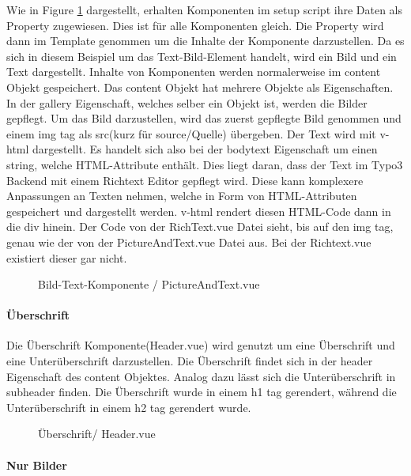 Wie in Figure \ref{fig:Bild-Text-Komponente} dargestellt, erhalten Komponenten im setup script ihre Daten als Property zugewiesen. Dies ist für alle Komponenten gleich. Die Property wird dann im Template genommen um die Inhalte der Komponente darzustellen. Da es sich in diesem Beispiel um das Text-Bild-Element handelt, wird ein Bild und ein Text dargestellt. Inhalte von Komponenten werden normalerweise im content Objekt gespeichert. Das content Objekt hat mehrere Objekte als Eigenschaften. In der gallery Eigenschaft, welches selber ein Objekt ist, werden die Bilder gepflegt. Um das Bild darzustellen, wird das zuerst gepflegte Bild genommen und einem img tag als src(kurz für source/Quelle) übergeben. Der Text wird mit v-html dargestellt. Es handelt sich also bei der bodytext Eigenschaft um einen string, welche HTML-Attribute enthält. Dies liegt daran, dass der Text im Typo3 Backend mit einem Richtext Editor gepflegt wird. Diese kann komplexere Anpassungen an Texten nehmen, welche in Form von HTML-Attributen gespeichert und dargestellt werden. v-html rendert diesen HTML-Code dann in die div hinein. Der Code von der RichText.vue Datei sieht, bis auf den img tag, genau wie der von der PictureAndText.vue Datei aus. Bei der Richtext.vue existiert dieser gar nicht.

\begin{figure}[htb]
\centering
{}
\caption{Bild-Text-Komponente / PictureAndText.vue}
\label{fig:Bild-Text-Komponente}
\end{figure}
\paragraph{Überschrift}
Die Überschrift Komponente(Header.vue) wird genutzt um eine Überschrift und eine Unterüberschrift darzustellen. Die Überschrift findet sich in der header Eigenschaft des content Objektes. Analog dazu lässt sich die Unterüberschrift in subheader finden. Die Überschrift wurde in einem h1 tag gerendert, während die Unterüberschrift in einem h2 tag gerendert wurde.

\begin{figure}[htb]
\centering
{}
\caption{Überschrift/ Header.vue}
\label{fig:berschrift/ Header.vue}
\end{figure}

\paragraph{Nur Bilder}

